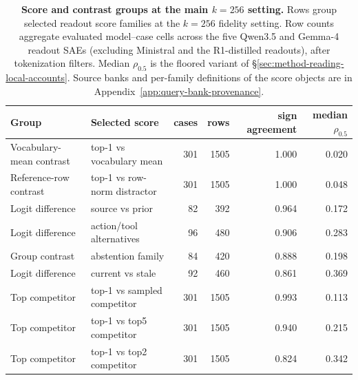 \begin{table}[!tbp]
\caption{\textbf{Score and contrast groups at the main \(k=256\) setting.}
Rows group selected readout score families at the \(k=256\) fidelity
setting. Row counts aggregate evaluated model--case cells across the five
Qwen3.5 and Gemma-4 readout SAEs
(excluding Ministral and the R1-distilled readouts), after tokenization
filters. Median \(\rho_{0.5}\) is the floored variant of
\S\ref{sec:method-reading-local-accounts}. Source banks and per-family
definitions of the score objects are in
Appendix~\ref{app:query-bank-provenance}.}
\label{tab:readout-score-families}
\centering
\small
\setlength{\tabcolsep}{5pt}
\renewcommand{\arraystretch}{1.05}
\begin{tabularx}{0.96\textwidth}{@{}>{\RaggedRight\arraybackslash}p{}Yrrrr@{}}
\toprule
Group & Selected score & cases & rows & sign agreement & median \(\rho_{0.5}\) \\
\midrule
Vocabulary-mean contrast & top-1 vs vocabulary mean & 301 & 1505 & 1.000 & 0.020 \\
Reference-row contrast & top-1 vs row-norm distractor & 301 & 1505 & 1.000 & 0.048 \\
\addlinespace
Logit difference & source vs prior & 82 & 392 & 0.964 & 0.172 \\
Logit difference & action/tool alternatives & 96 & 480 & 0.906 & 0.283 \\
Group contrast & abstention family & 84 & 420 & 0.888 & 0.198 \\
Logit difference & current vs stale & 92 & 460 & 0.861 & 0.369 \\
\addlinespace
Top competitor & top-1 vs sampled competitor & 301 & 1505 & 0.993 & 0.113 \\
Top competitor & top-1 vs top5 competitor & 301 & 1505 & 0.940 & 0.215 \\
Top competitor & top-1 vs top2 competitor & 301 & 1505 & 0.824 & 0.342 \\
\bottomrule
\end{tabularx}
\end{table}

